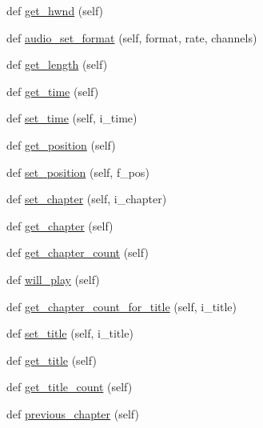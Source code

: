 \begin{DoxyCompactItemize}
\item 
def \hyperlink{classsrc_1_1lib_1_1vlc_1_1MediaPlayer_a012c90b9498719b07fd166c29abc0e8d}{get\+\_\+hwnd} (self)
\item 
def \hyperlink{classsrc_1_1lib_1_1vlc_1_1MediaPlayer_a674aacbc9b080a61e3d440c3a498a8d7}{audio\+\_\+set\+\_\+format} (self, format, rate, channels)
\item 
def \hyperlink{classsrc_1_1lib_1_1vlc_1_1MediaPlayer_a373c8d8f499288284ae12a2aa73ce96d}{get\+\_\+length} (self)
\item 
def \hyperlink{classsrc_1_1lib_1_1vlc_1_1MediaPlayer_ad103f94a34e009402852d7e00a3d6cd6}{get\+\_\+time} (self)
\item 
def \hyperlink{classsrc_1_1lib_1_1vlc_1_1MediaPlayer_a18efdd20988db9c578f175270c169d54}{set\+\_\+time} (self, i\+\_\+time)
\item 
def \hyperlink{classsrc_1_1lib_1_1vlc_1_1MediaPlayer_a9b72ddf97057a5c3443635985dde1389}{get\+\_\+position} (self)
\item 
def \hyperlink{classsrc_1_1lib_1_1vlc_1_1MediaPlayer_a9f80dfc502b5abf41c01a6c7eef740e3}{set\+\_\+position} (self, f\+\_\+pos)
\item 
def \hyperlink{classsrc_1_1lib_1_1vlc_1_1MediaPlayer_adecb86a817d32db7ef243bfab6705ec5}{set\+\_\+chapter} (self, i\+\_\+chapter)
\item 
def \hyperlink{classsrc_1_1lib_1_1vlc_1_1MediaPlayer_a58f479b2e275a53161508ee2b266cde9}{get\+\_\+chapter} (self)
\item 
def \hyperlink{classsrc_1_1lib_1_1vlc_1_1MediaPlayer_aa7031d6e26e432e8bfeab2f7f38ef854}{get\+\_\+chapter\+\_\+count} (self)
\item 
def \hyperlink{classsrc_1_1lib_1_1vlc_1_1MediaPlayer_a17a09ea748e103c89a691d12b78e20bd}{will\+\_\+play} (self)
\item 
def \hyperlink{classsrc_1_1lib_1_1vlc_1_1MediaPlayer_a46b17d5e90d15d4b5722953d96430dc3}{get\+\_\+chapter\+\_\+count\+\_\+for\+\_\+title} (self, i\+\_\+title)
\item 
def \hyperlink{classsrc_1_1lib_1_1vlc_1_1MediaPlayer_ab6b826a8b4aaf135ef60114e26779697}{set\+\_\+title} (self, i\+\_\+title)
\item 
def \hyperlink{classsrc_1_1lib_1_1vlc_1_1MediaPlayer_a37919d4c470acbf72d79c87f34bcedea}{get\+\_\+title} (self)
\item 
def \hyperlink{classsrc_1_1lib_1_1vlc_1_1MediaPlayer_a95e6795e0f76b9cb8579a299e6c2b24b}{get\+\_\+title\+\_\+count} (self)
\item 
def \hyperlink{classsrc_1_1lib_1_1vlc_1_1MediaPlayer_a72f5ea15c85220d6246858a30d20e26a}{previous\+\_\+chapter} (self)

\end{DoxyCompactItemize}
